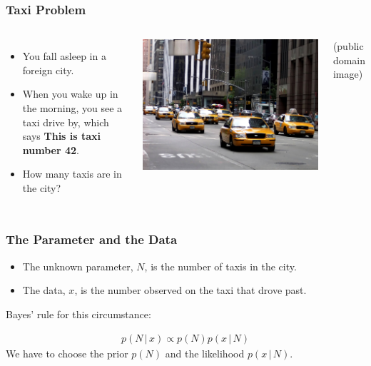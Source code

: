 \documentclass{beamer}
\newcommand{\given}{\,|\,}
\begin{document}
\begin{frame}
\frametitle{Taxi Problem}

    \begin{columns} %

        \begin{itemize}
        \item You fall asleep in a foreign city.
        \item When you wake up in the morning, you see a taxi drive by,
              which says {\bf This is taxi number 42}.
        \item How many taxis are in the city?
        \end{itemize}

        \includegraphics[width=0.95\linewidth]{images/taxis.jpg}
       
         (public domain image)
     \end{columns}

\end{frame}

\begin{frame}
\frametitle{The Parameter and the Data}

\begin{itemize}
\item The unknown parameter, $N$, is the number of taxis in the city.\pause
\item The data, $x$, is the number observed on the taxi that drove past.
\end{itemize}
\pause
Bayes' rule for this circumstance:

\begin{align}
p(N \given x) \propto p(N)p(x \given N)
\end{align}
We have to choose the prior $p(N)$ and the likelihood $p(x \given N)$.

\end{frame}
\end{document}
